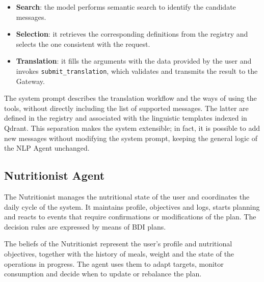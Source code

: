 \documentclass[12pt,a4paper]{article}
\begin{document}
\begin{itemize}
    \item \textbf{Search}: the model performs semantic search to identify the candidate messages.
    \item \textbf{Selection}: it retrieves the corresponding definitions from the registry and selects the one consistent with the request.
    \item \textbf{Translation}: it fills the arguments with the data provided by the user and invokes
    \texttt{submit\_translation}, which validates and transmits the result to the Gateway.
\end{itemize}

The system prompt describes the translation workflow and the ways of using the tools,
without directly including the list of supported messages.
The latter are defined in the registry and associated with the linguistic templates indexed in Qdrant.
This separation makes the system extensible; in fact, it is possible to add new messages
without modifying the system prompt, keeping the general logic of the NLP Agent unchanged.

\subsection{Nutritionist Agent}

The Nutritionist manages the nutritional state of the user and coordinates the daily cycle of the
system. It maintains profile, objectives and logs, starts planning and reacts to events
that require confirmations or modifications of the plan. The decision rules are expressed by means of
BDI plans.

The beliefs of the Nutritionist represent the user's profile and nutritional objectives,
together with the history of meals, weight and the state of the operations in progress. The agent uses them
to adapt targets, monitor consumption and decide when to update or rebalance the plan.
\end{document}
